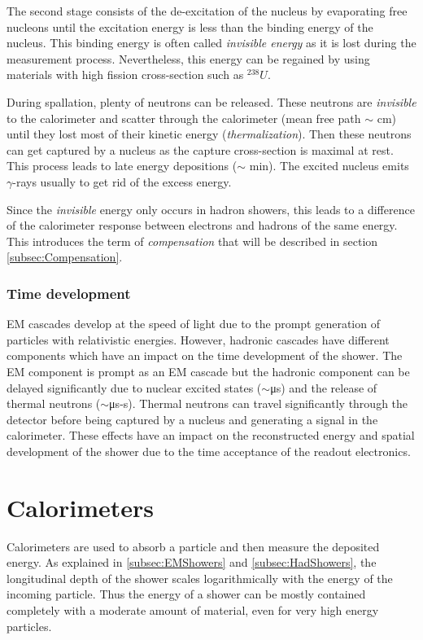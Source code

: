 The second stage consists of the de-excitation of the nucleus by evaporating free nucleons until the excitation energy is less than the binding energy of the nucleus. This binding energy is often called \textit{invisible energy} as it is lost during the measurement process. Nevertheless, this energy can be regained by using materials with high fission cross-section such as $^{238}U$.

During spallation, plenty of neutrons can be released. These neutrons are \textit{invisible} to the calorimeter and scatter through the calorimeter (mean free path $\sim$ cm) until they lost most of their kinetic energy (\textit{thermalization}). Then these neutrons can get captured by a nucleus as the capture cross-section is maximal at rest. This process leads to late energy depositions ($\sim$ min). The excited nucleus emits $\gamma$-rays usually to get rid of the excess energy.

Since the \textit{invisible} energy only occurs in hadron showers, this leads to a difference of the calorimeter response between electrons and hadrons of the same energy. This introduces the term of \textit{compensation} that will be described in section \ref{subsec:Compensation}.

\subsubsection{Time development}
\label{sec:TimeDevShowers}

EM cascades develop at the speed of light due to the prompt generation of particles with relativistic energies. However, hadronic cascades have different components which have an impact on the time development of the shower. The EM component is prompt as an EM cascade but the hadronic component can be delayed significantly due to nuclear excited states ($\sim$\si{\micro\second}) and the release of thermal neutrons ($\sim$\si{\micro\second}-\si{\second}). Thermal neutrons can travel significantly through the detector before being captured by a nucleus and generating a signal in the calorimeter. These effects have an impact  on the reconstructed energy and spatial development of the shower due to the time acceptance of the readout electronics.

\section{Calorimeters}

Calorimeters are used to absorb a particle and then measure the deposited energy. As explained in \ref{subsec:EMShowers} and \ref{subsec:HadShowers}, the longitudinal depth of the shower scales logarithmically with the energy of the incoming particle. Thus the energy of a shower can be mostly contained completely with a moderate amount of material, even for very high energy particles.

